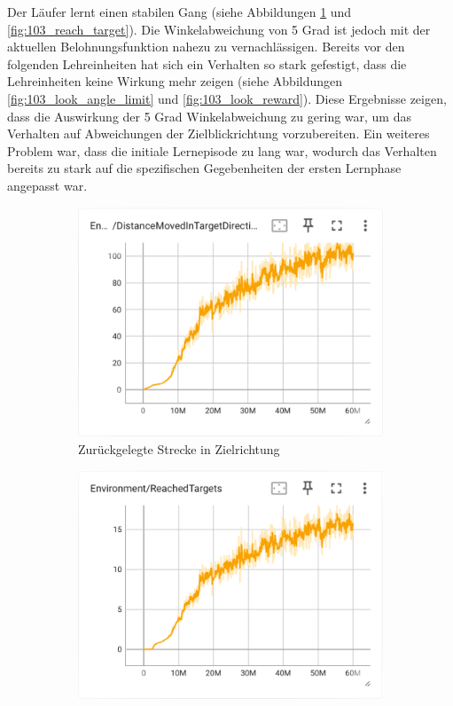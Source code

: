 Der Läufer lernt einen stabilen Gang (siehe Abbildungen \ref{fig:103_move_target_dir} und \ref{fig:103_reach_target}). Die Winkelabweichung von 5 Grad ist jedoch mit der aktuellen Belohnungsfunktion nahezu zu vernachlässigen. Bereits vor den folgenden Lehreinheiten hat sich ein Verhalten so stark gefestigt, dass die Lehreinheiten keine Wirkung mehr zeigen (siehe Abbildungen \ref{fig:103_look_angle_limit} und \ref{fig:103_look_reward}). Diese Ergebnisse zeigen, dass die Auswirkung der 5 Grad Winkelabweichung zu gering war, um das Verhalten auf Abweichungen der Zielblickrichtung vorzubereiten. Ein weiteres Problem war, dass die initiale Lernepisode zu lang war, wodurch das Verhalten bereits zu stark auf die spezifischen Gegebenheiten der ersten Lernphase angepasst war.

\begin{figure}[H]
  \centering  
    \begin{subfigure}{.49\textwidth}
      \centering  
      \includegraphics[width=\textwidth]{img/103_move_target_dir}
      \caption{Zurückgelegte Strecke in Zielrichtung}
      \label{fig:103_move_target_dir}
    \end{subfigure}
    \begin{subfigure}{.49\textwidth}
      \centering  
      \includegraphics[width=\textwidth]{img/103_reach_target}

\end{subfigure}
\end{figure}
